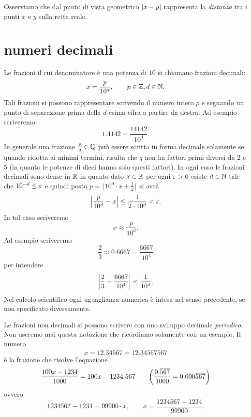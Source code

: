 Osserviamo che dal punto di vista geometrico
${\left|x-y\right|}$ rappresenta la \emph{distanza} tra i punti
$x$ e $y$ sulla retta reale.

\section{numeri decimali}
%
Le frazioni il cui denominatore è una potenza
di $10$ si chiamano frazioni decimali:
\[
  x = \frac{p}{10^d}, \qquad p\in {\mathbb Z}, d\in {\mathbb N}.
\]
Tali frazioni si possono rappresentare
scrivendo il numero
intero $p$ e segnando un punto%
%
di separazione
prima della $d$-esima cifra a partire da destra.
Ad esempio scriveremo:
\[
  1.4142 = \frac{14142}{10^4}.
\]
In generale una frazione $\frac{p}{q}\in {\mathbb Q}$
può essere scritta in forma decimale solamente
se, quando ridotta ai minimi termini,
risulta che $q$ non ha fattori primi diversi
da $2$ e $5$ (in quanto le potenze di dieci
hanno solo questi fattori).
In ogni caso le frazioni decimali sono dense in ${\mathbb R}$
in quanto dato $x\in {\mathbb R}$ per ogni $\varepsilon>0$ esiste
$d\in {\mathbb N}$ tale che $10^{-d}\le\varepsilon$ e quindi
posto $p=\lfloor 10^d\cdot x + \frac 1 2\rfloor$
si avrà
\[
    {\left|\frac{p}{10^d} - x\right|} \le \frac{1}{2\cdot 10^d} < \varepsilon.
\]
In tal caso scriveremo
\mymargin{$\approx$}
\[
  x \approx \frac{p}{10^d}.
\]
Ad esempio scriveremo
\[
  \frac 2 3 \approx 0.6667 = \frac{6667}{10^4}
\]
per intendere%
%
\begin{equation}\label{eq:approx_23}
{\left|\frac 2 3 - \frac{6667}{10^4}\right|}<\frac{1}{10^4}.
\end{equation}
Nel calcolo scientifico ogni uguaglianza numerica è intesa nel 
senso precedente, se non specificato diversamente. 

Le frazioni non decimali si possono scrivere con uno sviluppo
decimale \emph{periodico}. 
Non useremo mai questa notazione
che ricordiamo solamente con un esempio.
Il numero
\[
  x = 12.34\overline{567}
    = 12.34567\overline{567}
\]
è la frazione che risolve l'equazione
\[
  \frac{100x - 1234}{1000}
  = 100x-1234.567
  \qquad
{\left( \frac{0.\overline{567}}{1000}
= 0.000\overline{567}  \right)}
\]
ovvero
\[
  1234567 - 1234 = 99900 \cdot x,
  \qquad x = \frac{1234567-1234}{99900}.
\]

